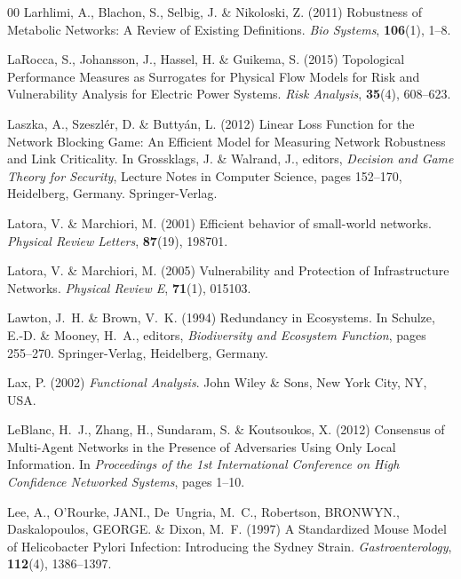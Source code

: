 \documentclass{comnet-mod}
\begin{document}
\begin{thebibliography}{00}
Larhlimi, A., Blachon, S., Selbig, J. {\&} Nikoloski, Z. (2011)  {Robustness of
  Metabolic Networks: {{A}} Review of Existing Definitions}. {\em {Bio
  Systems}}, \textbf{106}(1), 1--8.

LaRocca, S., Johansson, J., Hassel, H. {\&} Guikema, S. (2015)  {Topological
  Performance Measures as Surrogates for Physical Flow Models for Risk and
  Vulnerability Analysis for Electric Power Systems}. {\em {Risk Analysis}},
  \textbf{35}(4), 608--623.

Laszka, A., Szeszl{\'e}r, D. {\&} Butty{\'a}n, L. (2012)  {Linear {{Loss
  Function}} for the {{Network Blocking Game}}: {{An Efficient Model}} for
  {{Measuring Network Robustness}} and {{Link Criticality}}}. In Grossklags, J.
  {\&} Walrand, J., editors, {\em {Decision and {{Game Theory}} for
  {{Security}}}}, Lecture {{Notes}} in {{Computer Science}}, pages 152--170,
  {Heidelberg, Germany}. {Springer-Verlag}.

Latora, V. {\&} Marchiori, M. (2001)  Efficient behavior of small-world
  networks. {\em {Physical Review Letters}}, \textbf{87}(19), 198701.

Latora, V. {\&} Marchiori, M. (2005)  {Vulnerability and Protection of
  Infrastructure Networks}. {\em {Physical Review E}}, \textbf{71}(1), 015103.

Lawton, J.~H. {\&} Brown, V.~K. (1994)  {Redundancy in Ecosystems}. In Schulze,
  E.-D. {\&} Mooney, H.~A., editors, {\em {Biodiversity and Ecosystem
  Function}}, pages 255--270. {Springer-Verlag}, Heidelberg, Germany.

Lax, P. (2002) {\em {Functional Analysis}}.
{John Wiley \& Sons}, {New York City, NY, USA}.

LeBlanc, H.~J., Zhang, H., Sundaram, S. {\&} Koutsoukos, X. (2012)  {Consensus
  of Multi-Agent Networks in the Presence of Adversaries Using Only Local
  Information}. In {\em {Proceedings of the 1st International Conference on
  {{High Confidence Networked Systems}}}}, pages 1--10.

Lee, A., O'Rourke, {\relax JANI}., De~Ungria, M.~C., Robertson, {\relax
  BRONWYN}., Daskalopoulos, {\relax GEORGE}. {\&} Dixon, M.~F. (1997)  {A
  Standardized Mouse Model of {{Helicobacter}} Pylori Infection:
  {{Introducing}} the {{Sydney}} Strain}. {\em {Gastroenterology}},
  \textbf{112}(4), 1386--1397.


\end{thebibliography}
\end{document}
